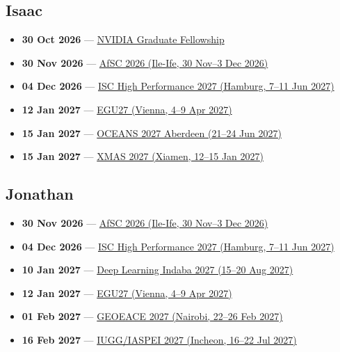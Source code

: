 \subsection*{Isaac}
\begin{itemize}[leftmargin=1.4em,itemsep=0.1em]
  \item \textbf{30 Oct 2026} --- \href{https://research.nvidia.com/graduate-fellowships}{NVIDIA Graduate Fellowship}
  \item \textbf{30 Nov 2026} --- \href{https://afsc2026.oauife.edu.ng/}{AfSC 2026 (Ile-Ife, 30 Nov--3 Dec 2026)}
  \item \textbf{04 Dec 2026} --- \href{https://isc-hpc.com/}{ISC High Performance 2027 (Hamburg, 7--11 Jun 2027)}
  \item \textbf{12 Jan 2027} --- \href{https://www.egu27.eu/}{EGU27 (Vienna, 4--9 Apr 2027)}
  \item \textbf{15 Jan 2027} --- \href{https://aberdeen27.oceansconference.org/2027-call-for-abstracts/}{OCEANS 2027 Aberdeen (21--24 Jun 2027)}
  \item \textbf{15 Jan 2027} --- \href{https://www.aconf.org/conf_228283/contribution/507.html}{XMAS 2027 (Xiamen, 12--15 Jan 2027)}
\end{itemize}

\subsection*{Jonathan}
\begin{itemize}[leftmargin=1.4em,itemsep=0.1em]
  \item \textbf{30 Nov 2026} --- \href{https://afsc2026.oauife.edu.ng/}{AfSC 2026 (Ile-Ife, 30 Nov--3 Dec 2026)}
  \item \textbf{04 Dec 2026} --- \href{https://isc-hpc.com/}{ISC High Performance 2027 (Hamburg, 7--11 Jun 2027)}
  \item \textbf{10 Jan 2027} --- \href{https://deeplearningindaba.com/}{Deep Learning Indaba 2027 (15--20 Aug 2027)}
  \item \textbf{12 Jan 2027} --- \href{https://www.egu27.eu/}{EGU27 (Vienna, 4--9 Apr 2027)}
  \item \textbf{01 Feb 2027} --- \href{https://gsk.or.ke/geoeace27/}{GEOEACE 2027 (Nairobi, 22--26 Feb 2027)}
  \item \textbf{16 Feb 2027} --- \href{https://iugg2027korea.org/?hl=ENG}{IUGG/IASPEI 2027 (Incheon, 16--22 Jul 2027)}
\end{itemize}

